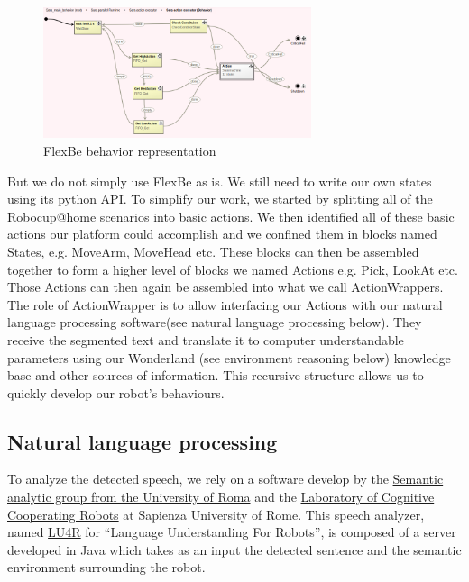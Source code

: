 \documentclass[runningheads,a4paper]{llncs}
\begin{document}
\begin{figure}[h!]
	\centering
	\includegraphics[width=0.70\textwidth]{images/flexbe.png}
	\caption{FlexBe behavior representation}
\end{figure}

But we do not simply use FlexBe as is. We still need to write our own states using its python API. To simplify our work, we started by splitting all of the Robocup@home scenarios into basic actions. We then identified all of these basic actions our platform could accomplish and we confined them in blocks named States, e.g. MoveArm, MoveHead etc. These blocks can then be assembled together to form a higher level of blocks we named Actions e.g. Pick, LookAt etc. Those Actions can then again be assembled into what we call ActionWrappers. The role of ActionWrapper is to allow interfacing our Actions with our natural language processing software(see natural language processing below). They receive the segmented text and translate it to computer understandable parameters using our Wonderland (see environment reasoning below) knowledge base and other sources of information. This recursive structure allows us to quickly develop our robot’s behaviours.\\

\subsection{Natural language processing}
\tab To analyze the detected speech, we rely on a software develop by the  \href{http://sag.art.uniroma2.it/}{Semantic analytic group from the University of Roma} and the \href{http://labrococo.dis.uniroma1.it/}{Laboratory of Cognitive Cooperating Robots} at Sapienza University of Rome. This speech analyzer, named \href{http://sag.art.uniroma2.it/lu4r.html}{LU4R}\cite{lu4r} for “Language Understanding For Robots”, is composed of a server developed in Java which takes as an input the detected sentence and the semantic environment surrounding the robot.\\
\end{document}
